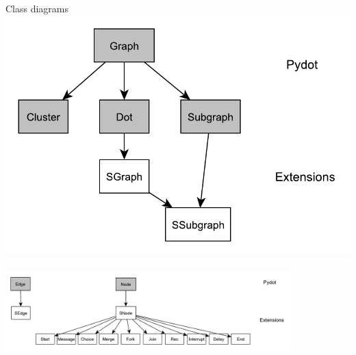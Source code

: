 \documentclass[8 pt]{beamer}
\begin{document}
\begin{frame}{Class diagrams}
\includegraphics[scale=0.5]{graph_organisation}
~~\\
\includegraphics[width=11cm]{node_organisation}
\end{frame}
\end{document}

